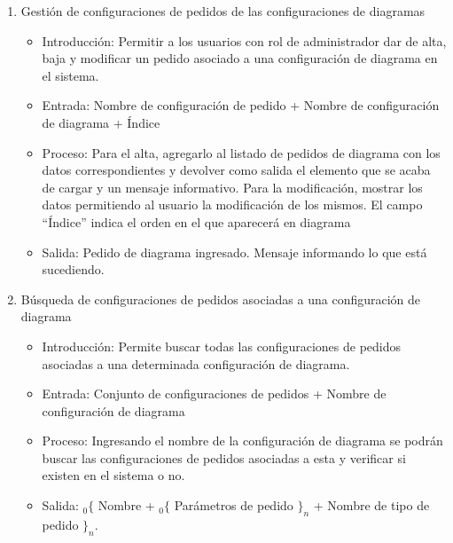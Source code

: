 \begin{enumerate}
			\item Gestión de configuraciones de pedidos de las configuraciones de diagramas
				\begin{itemize}
					\item Introducción: Permitir a los usuarios con rol de administrador dar de alta, baja y modificar un pedido asociado a una configuración de diagrama en el sistema.
					\item Entrada: Nombre de configuración de pedido + Nombre de configuración de diagrama + Índice
					\item Proceso: Para el alta, agregarlo al listado de pedidos de diagrama con los datos correspondientes y devolver como salida el elemento que se acaba de cargar y un mensaje informativo.
					Para la modificación, mostrar los datos permitiendo al usuario la modificación de los mismos.
					El campo ``Índice'' indica el orden en el que aparecerá en diagrama
					\item Salida: Pedido de diagrama ingresado. Mensaje informando lo que está sucediendo.
				\end{itemize}
				
			\item Búsqueda de configuraciones de pedidos asociadas a una configuración de diagrama
				\begin{itemize}
					\item Introducción: Permite buscar todas las configuraciones de pedidos asociadas a una determinada configuración de diagrama.
					\item Entrada: Conjunto de configuraciones de pedidos + Nombre de configuración de diagrama
					\item Proceso: Ingresando el nombre de la configuración de diagrama se podrán buscar las configuraciones de pedidos asociadas a esta y verificar si existen en el sistema o no.
					\item Salida: ${}_{0}\{$  Nombre + ${}_{0}\{$ Parámetros de pedido $\}_n$ + Nombre de tipo de pedido $\}_n$.
				\end{itemize}
				

\end{enumerate}
